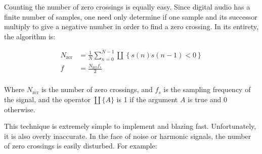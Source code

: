 \documentclass{article}
\begin{document}
Counting the number of zero crossings is equally easy. Since digital audio has a finite number of samples, one need only determine if one sample and its successor multiply to give a negative number in order to find a zero crossing. In its entirety, the algorithm is\cite{Torres-Garcia2022Pre-processingExtraction}:

\begin{align*}
    N_{\text{zcr}} & = \frac{1}{N} \sum_{n=0}^{N-1} \coprod \left\{ s(n)s(n-1) < 0 \right\} \\
    f & = \frac{N_{\text{zcr}}f_s}{2} \\
\end{align*}

Where $N_{\text{zcr}}$ is the number of zero crossings, and $f_s$ is the sampling frequency of the signal, and the operator $\coprod \{A\}$ is 1 if the argument $A$ is true and $0$ otherwise.

This technique is extremely simple to implement and blazing fast. Unfortunately, it is also overly inaccurate. In the face of noise or harmonic signals, the number of zero crossings is easily disturbed. For example:

\begin{center}
    \begin{multicols}{2}
        \noindent {}
    
    \end{multicols}
\end{center}
\end{document}

